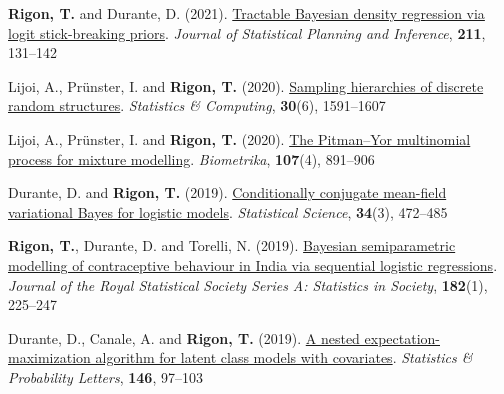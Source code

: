 \documentclass[a4paper,10pt]{article}
\begin{document}
\begin{pubs}
\item \textbf{Rigon, T.} and Durante, D. (2021). \href{https://doi.org/10.1016/j.jspi.2020.05.009}{Tractable Bayesian density regression via logit stick-breaking priors}. \emph{Journal of Statistical Planning and Inference}, \textbf{211}, 131--142
\item Lijoi, A., Pr\"unster, I. and \textbf{Rigon, T.} (2020). \href{https://doi.org/10.1007/s11222-020-09961-7}{Sampling hierarchies of discrete random structures}. \emph{Statistics \& Computing}, \textbf{30}(6), 1591--1607
\item Lijoi, A., Pr\"unster, I. and \textbf{Rigon, T.} (2020). \href{https://doi.org/10.1093/biomet/asaa030}{The Pitman--Yor multinomial process for mixture modelling}. \emph{Biometrika}, \textbf{107}(4), 891--906
\item Durante, D. and \textbf{Rigon, T.} (2019). \href{https://doi.org/10.1214/19-STS712}{Conditionally conjugate mean-field variational Bayes for logistic models}. \emph{Statistical Science}, \textbf{34}(3), 472--485
\item \textbf{Rigon, T.}, Durante, D. and Torelli, N. (2019). \href{https://doi.org/10.1111/rssa.12361}{Bayesian semiparametric modelling of contraceptive behaviour in India via sequential logistic regressions}. \emph{Journal of the Royal Statistical Society Series A: Statistics in Society}, \textbf{182}(1), 225--247
\item Durante, D., Canale, A. and \textbf{Rigon, T.} (2019). \href{https://doi.org/10.1016/j.spl.2018.10.015}{A nested expectation-maximization algorithm for latent class models with covariates}. \emph{Statistics \& Probability Letters}, \textbf{146}, 97--103
\end{pubs}
\end{document}
